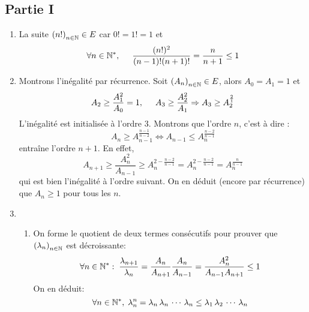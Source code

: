 \subsection*{Partie I}
\begin{enumerate}
  \item La suite $\left( n!\right)_{n\in \mathbb{N}} \in E$ car $0! = 1! = 1$ et 
\begin{displaymath}
\forall n \in \mathbb{N}^*, \hspace{0.5cm} \frac{(n!)^2}{(n-1)!(n+1)!} = \frac{n}{n+1} \leq 1
\end{displaymath}

  \item Montrons l'inégalité par récurrence. Soit $\left( A_n\right)_{n\in \mathbb{N}} \in E$, alors $A_0=A_1=1$ et
\begin{displaymath}
A_2 \geq \frac{A_1^2}{A_0} = 1,\hspace{0.5cm} A_3 \geq \frac{A_2^2}{A_1} \Rightarrow A_3 \geq A_2^{\frac{2}{1}} 
\end{displaymath}
L'inégalité est initialisée à l'ordre $3$. Montrons que l'ordre $n$, c'est à dire :
\begin{displaymath}
A_{n} \geq A_{n-1}^{\frac{n-1}{n-2}} \Leftrightarrow A_{n-1} \leq A_{n}^{\frac{n-2}{n-1}}  
\end{displaymath}
entraîne l'ordre $n+1$. En effet,
\begin{displaymath}
  A_{n+1} \geq \frac{A_n^{2}}{A_{n-1}} \geq A_{n}^{2 -\frac{n-2}{n-1}} = A_{n}^{2 -\frac{n-2}{n-1}} = A_{n}^{\frac{n}{n-1}}
\end{displaymath}
qui est bien l'inégalité à l'ordre suivant. On en déduit (encore par récurrence) que $A_n\geq 1$ pour tous les $n$.

  \item 
\begin{enumerate}
  \item On forme le quotient  de deux termes consécutifs pour prouver que $\left( \lambda_n\right)_{n\in \mathbb{N}}$ est décroissante:
\begin{displaymath}
\forall n \in \mathbb{N}^*: \; \frac{\lambda_{n+1}}{\lambda_n} = \frac{A_n}{A_{n+1}} \frac{A_n}{A_{n-1}} = \frac{A_n^2}{A_{n-1} A_{n+1}} \leq 1 
\end{displaymath}
On en déduit:
\begin{displaymath}
\forall n \in \mathbb{N}^*, \; \lambda_n^n = \lambda_n\, \lambda_n\, \cdots \, \lambda_n \leq \lambda_1\, \lambda_2\, \cdots \, \lambda_n  
\end{displaymath}


\end{enumerate}
\end{enumerate}
